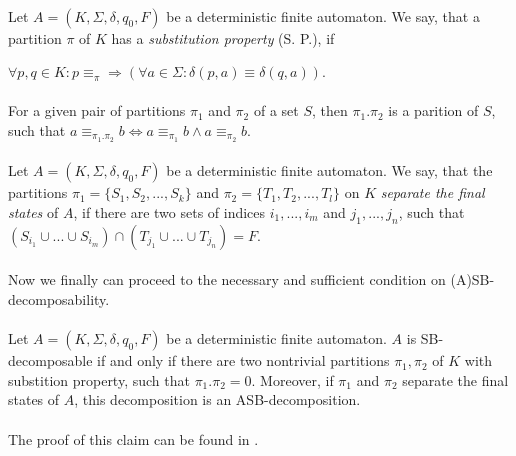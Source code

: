 \paragraph{}
 Let $A=(K, \Sigma, \delta, q_0, F)$ be a deterministic finite automaton. We say, that a partition $\pi$ of $K$ has a \emph{substitution property} (S. P.), if \\
\centerline{$\forall p, q \in K: p \equiv_{\pi} \Rightarrow (\forall a\in \Sigma: \delta(p,a)\equiv \delta(q,a))$.}

\paragraph{}
 For a given pair of partitions $\pi_1$ and $\pi_2$ of a set $S$, then $\pi_1 . \pi_2$ is a parition of $S$, such that $a \equiv_{\pi_1 . \pi_2} b \Leftrightarrow a \equiv_{\pi_1} b \wedge a \equiv_{\pi_2} b$.

\paragraph{}
 Let $A = (K, \Sigma, \delta, q_0, F)$ be a deterministic finite automaton. We say, that the partitions $\pi_1=\{S_1, S_2, ..., S_k\}$ and $\pi_2=\{T_1,T_2,..., T_l\}$ on $K$ \emph{separate the final states} of $A$, if there are two sets of indices $i_1, ..., i_m$ and $j_1, ..., j_n$, such that $(S_{i_1} \cup ... \cup S_{i_m}) \cap (T_{j_1} \cup ... \cup T_{j_n}) = F$.

\paragraph{}
Now we finally can proceed to the necessary and sufficient condition on (A)SB-decomposability.

\paragraph{}
\cveta Let $A = (K, \Sigma, \delta, q_0,F)$ be a deterministic finite automaton. $A$ is SB-decomposable if and only if there are two nontrivial partitions $\pi_1, \pi_2$ of $K$ with substition property, such that $\pi_1 . \pi_2 = 0$. Moreover, if $\pi_1$ and $\pi_2$ separate the final states of $A$, this decomposition is an ASB-decomposition.

\paragraph{}
The proof of this claim can be found in \cite{Gazi}.

\paragraph{}
